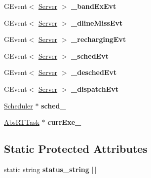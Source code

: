 \begin{DoxyCompactItemize}
\item 
G\+Event$<$ \hyperlink{classRTSim_1_1Server}{Server} $>$ {\bfseries \+\_\+band\+Ex\+Evt}\hypertarget{classRTSim_1_1Server_a55fa70ca2a06ab81513f2bbba343810e}{}\label{classRTSim_1_1Server_a55fa70ca2a06ab81513f2bbba343810e}

\item 
G\+Event$<$ \hyperlink{classRTSim_1_1Server}{Server} $>$ {\bfseries \+\_\+dline\+Miss\+Evt}\hypertarget{classRTSim_1_1Server_a3aa96fbc6cdfa8129a200f81d076222b}{}\label{classRTSim_1_1Server_a3aa96fbc6cdfa8129a200f81d076222b}

\item 
G\+Event$<$ \hyperlink{classRTSim_1_1Server}{Server} $>$ {\bfseries \+\_\+recharging\+Evt}\hypertarget{classRTSim_1_1Server_a069869913659c51a716a3ea38ba9dee2}{}\label{classRTSim_1_1Server_a069869913659c51a716a3ea38ba9dee2}

\item 
G\+Event$<$ \hyperlink{classRTSim_1_1Server}{Server} $>$ {\bfseries \+\_\+sched\+Evt}\hypertarget{classRTSim_1_1Server_a8573425f922dd23661efe086f6223b86}{}\label{classRTSim_1_1Server_a8573425f922dd23661efe086f6223b86}

\item 
G\+Event$<$ \hyperlink{classRTSim_1_1Server}{Server} $>$ {\bfseries \+\_\+desched\+Evt}\hypertarget{classRTSim_1_1Server_a021fed5fc9415927c570a62ba4a914ed}{}\label{classRTSim_1_1Server_a021fed5fc9415927c570a62ba4a914ed}

\item 
G\+Event$<$ \hyperlink{classRTSim_1_1Server}{Server} $>$ {\bfseries \+\_\+dispatch\+Evt}\hypertarget{classRTSim_1_1Server_aea3c597c457fd4ccebf0b49ac33ae928}{}\label{classRTSim_1_1Server_aea3c597c457fd4ccebf0b49ac33ae928}

\item 
\hyperlink{classRTSim_1_1Scheduler}{Scheduler} $\ast$ {\bfseries sched\+\_\+}\hypertarget{classRTSim_1_1Server_adf46e0b827fbce60fd80efbd4232642b}{}\label{classRTSim_1_1Server_adf46e0b827fbce60fd80efbd4232642b}

\item 
\hyperlink{classRTSim_1_1AbsRTTask}{Abs\+R\+T\+Task} $\ast$ {\bfseries curr\+Exe\+\_\+}\hypertarget{classRTSim_1_1Server_a05b9e9835c490ecebd1243e09a8e74f7}{}\label{classRTSim_1_1Server_a05b9e9835c490ecebd1243e09a8e74f7}

\end{DoxyCompactItemize}
\subsection*{Static Protected Attributes}
\begin{DoxyCompactItemize}
\item 
static string {\bfseries status\+\_\+string} \mbox{[}$\,$\mbox{]}
\end{DoxyCompactItemize}


